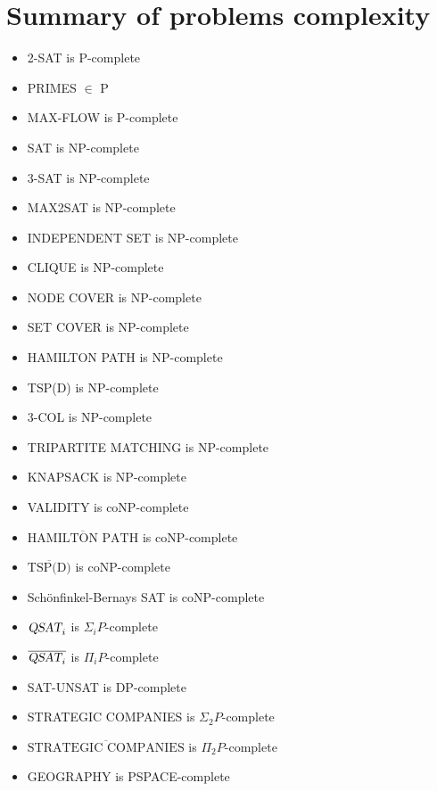 \section{Summary of problems complexity}
\begin{itemize}
    \item 2-SAT is P-complete
    \item PRIMES $\in$ P
    \item MAX-FLOW is P-complete
    \item SAT is NP-complete
    \item 3-SAT is NP-complete
    \item MAX2SAT is NP-complete
    \item INDEPENDENT SET is NP-complete
    \item CLIQUE is NP-complete
    \item NODE COVER is NP-complete
    \item SET COVER is NP-complete
    \item HAMILTON PATH is NP-complete
    \item TSP(D) is NP-complete
    \item 3-COL is NP-complete
    \item TRIPARTITE MATCHING is NP-complete
    \item KNAPSACK is NP-complete
    \item VALIDITY is coNP-complete
    \item $\overline{\text{HAMILTON PATH}}$ is coNP-complete
    \item $\overline{\text{TSP(D)}}$ is coNP-complete
    \item Schönfinkel-Bernays SAT is coNP-complete
    \item $\textsl{QSAT}_i$ is $\Sigma_iP$-complete
    \item $\overline{\textsl{QSAT}_i}$ is $\Pi_iP$-complete
    \item SAT-UNSAT is DP-complete
    \item STRATEGIC COMPANIES is $\Sigma_2P$-complete
    \item $\overline{\text{STRATEGIC COMPANIES}}$ is $\Pi_2P$-complete
    \item GEOGRAPHY is PSPACE-complete
\end{itemize}